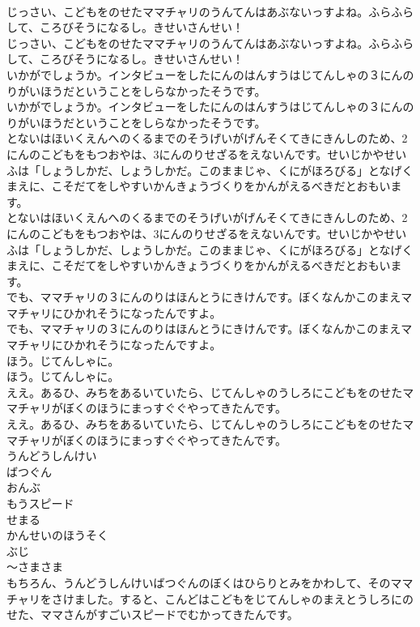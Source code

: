\documentclass[8pt]{extreport}
\begin{document}
\begin{CJK}{UTF8}{min}
\\	じっさい、こどもをのせたママチャリのうんてんはあぶないっすよね。ふらふらして、ころびそうになるし。きせいさんせい！
\\	じっさい、こどもをのせたママチャリのうんてんはあぶないっすよね。ふらふらして、ころびそうになるし。きせいさんせい！
\\	いかがでしょうか。インタビューをしたにんのはんすうはじてんしゃの３にんのりがいほうだということをしらなかったそうです。
\\	いかがでしょうか。インタビューをしたにんのはんすうはじてんしゃの３にんのりがいほうだということをしらなかったそうです。
\\	とないはほいくえんへのくるまでのそうげいがげんそくてきにきんしのため、2にんのこどもをもつおやは、3にんのりせざるをえないんです。せいじかやせいふは「しょうしかだ、しょうしかだ。このままじゃ、くにがほろびる」となげくまえに、こそだてをしやすいかんきょうづくりをかんがえるべきだとおもいます。
\\	とないはほいくえんへのくるまでのそうげいがげんそくてきにきんしのため、2にんのこどもをもつおやは、3にんのりせざるをえないんです。せいじかやせいふは「しょうしかだ、しょうしかだ。このままじゃ、くにがほろびる」となげくまえに、こそだてをしやすいかんきょうづくりをかんがえるべきだとおもいます。
\\	でも、ママチャリの３にんのりはほんとうにきけんです。ぼくなんかこのまえママチャリにひかれそうになったんですよ。
\\	でも、ママチャリの３にんのりはほんとうにきけんです。ぼくなんかこのまえママチャリにひかれそうになったんですよ。
\\	ほう。じてんしゃに。
\\	ほう。じてんしゃに。
\\	ええ。あるひ、みちをあるいていたら、じてんしゃのうしろにこどもをのせたママチャリがぼくのほうにまっすぐぐやってきたんです。
\\	ええ。あるひ、みちをあるいていたら、じてんしゃのうしろにこどもをのせたママチャリがぼくのほうにまっすぐぐやってきたんです。
\\	うんどうしんけい
\\	ばつぐん
\\	おんぶ
\\	もうスピード
\\	せまる
\\	かんせいのほうそく
\\	ぶじ
\\	～さまさま
\\	もちろん、うんどうしんけいばつぐんのぼくはひらりとみをかわして、そのママチャリをさけました。すると、こんどはこどもをじてんしゃのまえとうしろにのせた、ママさんがすごいスピードでむかってきたんです。

\end{CJK}
\end{document}
